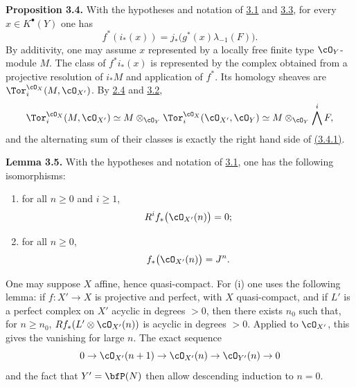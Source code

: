 \textbf{Proposition 3.4.} With the hypotheses and notation of \hyperlink{sga6.e07.para.3-1}{3.1} and \hyperlink{sga6.e07.para.3-3}{3.3}, for every \(x\in K^\bullet(Y)\) one has
\begin{equation}\tag{3.4.1}
f^*(i_*(x))=j_*\bigl(g^*(x)\lambda_{-1}(F)\bigr).
\end{equation}
By additivity, one may assume \(x\) represented by a locally free finite type \(\cO_Y\)-module \(M\). The class of \(f^*i_*(x)\) is represented by the complex obtained from a projective resolution of \(i_*M\) and application of \(f^*\). Its homology sheaves are \(\Tor_i^{\cO_X}(M,\cO_{X'})\). By \hyperlink{sga6.e07.lem.2-4}{2.4} and \hyperlink{sga6.e07.lem.3-2}{3.2},
\[
\Tor_i^{\cO_X}(M,\cO_{X'})
\simeq M\otimes_{\cO_Y}\Tor_i^{\cO_X}(\cO_{X'},\cO_Y)
\simeq M\otimes_{\cO_Y}\bigwedge^iF,
\]
and the alternating sum of their classes is exactly the right hand side of \hyperlink{sga6.e07.eq.3-4-1}{(3.4.1)}.

\textbf{Lemma 3.5.} With the hypotheses and notation of \hyperlink{sga6.e07.para.3-1}{3.1}, one has the following isomorphisms:
\begin{enumerate}[label=\roman*)]
\item for all \(n\ge0\) and \(i\ge1\),
\[
R^if_*\bigl(\cO_{X'}(n)\bigr)=0;
\]
\item for all \(n\ge0\),
\[
f_*\bigl(\cO_{X'}(n)\bigr)=J^n.
\]
\end{enumerate}
One may suppose \(X\) affine, hence quasi-compact. For (i) one uses the following lemma: if \(f:X'\to X\) is projective and perfect, with \(X\) quasi-compact, and if \(L'\) is a perfect complex on \(X'\) acyclic in degrees \(>0\), then there exists \(n_0\) such that, for \(n\ge n_0\), \(Rf_*(L'\otimes\cO_{X'}(n))\) is acyclic in degrees \(>0\). Applied to \(\cO_{X'}\), this gives the vanishing for large \(n\). The exact sequence
\[
0\to \cO_{X'}(n+1)\to\cO_{X'}(n)\to\cO_{Y'}(n)\to0
\]
and the fact that \(Y'=\bfP(N)\) then allow descending induction to \(n=0\).

